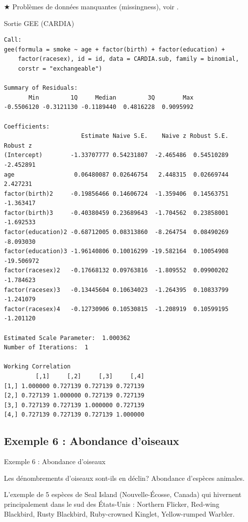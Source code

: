 \documentclass{BeamerTemplate}
\begin{document}
\begin{refsection}
\begin{frame}{}
\vfill
{\color{red} $\bigstar$ Problèmes de données manquantes (missingness), voir }.
\end{frame}

\begin{frame}[fragile]{Sortie GEE (CARDIA)}
\tiny
\begin{verbatim}
Call:
gee(formula = smoke ~ age + factor(birth) + factor(education) + 
    factor(racesex), id = id, data = CARDIA.sub, family = binomial, 
    corstr = "exchangeable")

Summary of Residuals:
       Min         1Q     Median         3Q        Max 
-0.5506120 -0.3121130 -0.1189440  0.4816228  0.9095992 

Coefficients:
                      Estimate Naive S.E.    Naive z Robust S.E.   Robust z
(Intercept)        -1.33707777 0.54231807  -2.465486  0.54510289  -2.452891
age                 0.06480087 0.02646754   2.448315  0.02669744   2.427231
factor(birth)2     -0.19856466 0.14606724  -1.359406  0.14563751  -1.363417
factor(birth)3     -0.40380459 0.23689643  -1.704562  0.23858001  -1.692533
factor(education)2 -0.68712005 0.08313860  -8.264754  0.08490269  -8.093030
factor(education)3 -1.96140806 0.10016299 -19.582164  0.10054908 -19.506972
factor(racesex)2   -0.17668132 0.09763816  -1.809552  0.09900202  -1.784623
factor(racesex)3   -0.13445604 0.10634023  -1.264395  0.10833799  -1.241079
factor(racesex)4   -0.12730906 0.10530815  -1.208919  0.10599195  -1.201120

Estimated Scale Parameter:  1.000362
Number of Iterations:  1

Working Correlation
         [,1]     [,2]     [,3]     [,4]
[1,] 1.000000 0.727139 0.727139 0.727139
[2,] 0.727139 1.000000 0.727139 0.727139
[3,] 0.727139 0.727139 1.000000 0.727139
[4,] 0.727139 0.727139 0.727139 1.000000
\end{verbatim}
\normalsize
\end{frame}


\subsection{Exemple 6 : Abondance d'oiseaux}

\begin{frame}{Exemple 6 : Abondance d'oiseaux}

Les dénombrements d'oiseaux sont-ils en déclin? Abondance d'espèces animales.

\bigskip

L'exemple de 5 espèces de Seal Island (Nouvelle-Écosse,
Canada) qui hivernent principalement dans le sud des États-Unis : Northern Flicker, Red-wing Blackbird, Rusty Blackbird,
Ruby-crowned Kinglet, Yellow-rumped Warbler.


\end{frame}
\end{refsection}
\end{document}

